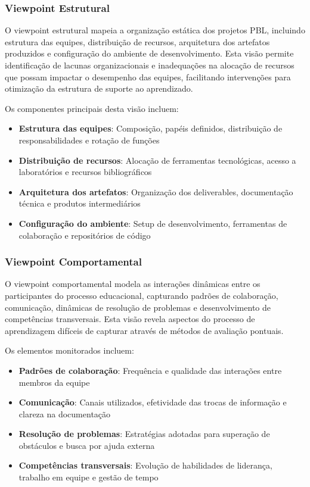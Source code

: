 \documentclass[english, spanish, brazilian]{modelo_dt}
\begin{document}
\subsubsection{Viewpoint Estrutural}

O viewpoint estrutural mapeia a organização estática dos projetos PBL,
incluindo estrutura das equipes, distribuição de recursos, arquitetura dos
artefatos produzidos e configuração do ambiente de desenvolvimento\@. Esta
visão permite identificação de lacunas organizacionais e inadequações na
alocação de recursos que possam impactar o desempenho das equipes, facilitando
intervenções para otimização da estrutura de suporte ao aprendizado\@.

Os componentes principais desta visão incluem:
\begin{itemize}
  \item \textbf{Estrutura das equipes}: Composição, papéis definidos, distribuição de responsabilidades e rotação de funções
  \item \textbf{Distribuição de recursos}: Alocação de ferramentas tecnológicas, acesso a laboratórios e recursos bibliográficos
  \item \textbf{Arquitetura dos artefatos}: Organização dos deliverables, documentação técnica e produtos intermediários
  \item \textbf{Configuração do ambiente}: Setup de desenvolvimento, ferramentas de colaboração e repositórios de código
\end{itemize}

\subsubsection{Viewpoint Comportamental}

O viewpoint comportamental modela as interações dinâmicas entre os
participantes do processo educacional, capturando padrões de colaboração,
comunicação, dinâmicas de resolução de problemas e desenvolvimento de
competências transversais\@. Esta visão revela aspectos do processo de
aprendizagem difíceis de capturar através de métodos de avaliação pontuais\@.

Os elementos monitorados incluem:
\begin{itemize}
  \item \textbf{Padrões de colaboração}: Frequência e qualidade das interações entre membros da equipe
  \item \textbf{Comunicação}: Canais utilizados, efetividade das trocas de informação e clareza na documentação
  \item \textbf{Resolução de problemas}: Estratégias adotadas para superação de obstáculos e busca por ajuda externa
  \item \textbf{Competências transversais}: Evolução de habilidades de liderança, trabalho em equipe e gestão de tempo
\end{itemize}
\end{document}
